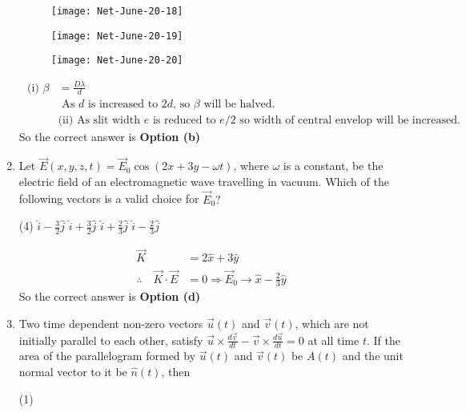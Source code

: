 \begin{enumerate}
\begin{tasks}
\begin{figure}[H]
		\centering
		\texttt{[image: Net-June-20-18]}
	\end{figure}
	\task[\textbf{c.}]
		\begin{figure}[H]
		\centering
		\texttt{[image: Net-June-20-19]}
	\end{figure}
	\task[\textbf{d.}] 
		\begin{figure}[H]
		\centering
		\texttt{[image: Net-June-20-20]}
	\end{figure}
\end{tasks}
\begin{answer}
	\begin{align*}
	\text { (i) } \beta&=\frac{D \lambda}{d}\\
&\text{	As $d$ is increased to $2 d$, so $\beta$ will be halved.}\\
	&\text{(ii) As slit width $e$ is reduced to $e / 2$ so width of central envelop will be increased.}
	\end{align*}
		So the correct answer is \textbf{Option (b)}
\end{answer}
\item  Let $\vec{E}(x, y, z, t)=\vec{E}_{0} \cos (2 x+3 y-\omega t)$, where $\omega$ is a constant, be the electric field of an electromagnetic wave travelling in vacuum. Which of the following vectors is a valid choice for $\vec{E}_{0} ?$	
 \begin{tasks}(4)
	\task[\textbf{a.}] $\hat{i}-\frac{3}{2} \hat{j}$
	\task[\textbf{b.}]$\hat{i}+\frac{3}{2} \hat{j}$
	\task[\textbf{c.}]$\hat{i}+\frac{2}{3} \hat{j}$
	\task[\textbf{d.}] $\hat{i}-\frac{2}{3} \hat{j}$
\end{tasks}
\begin{answer}
	\begin{align*}
\vec{K}&=2 \hat{x}+3 \hat{y}\\
	\therefore\quad \vec{K} \cdot \vec{E}&=0 \Rightarrow \vec{E}_{0} \rightarrow \hat{x}-\frac{2}{3} \hat{y}
	\end{align*}
		So the correct answer is \textbf{Option (d)}
\end{answer}
\item Two time dependent non-zero vectors $\vec{u}(t)$ and $\vec{v}(t)$, which are not initially parallel to each other, satisfy $\vec{u} \times \frac{d \vec{v}}{d t}-\vec{v} \times \frac{d \vec{u}}{d t}=0$ at all time $t$. If the area of the parallelogram formed by $\vec{u}(t)$ and $\vec{v}(t)$ be $A(t)$ and the unit normal vector to it be $\hat{n}(t)$, then
 \begin{tasks}(1)

\end{tasks}
\end{enumerate}
